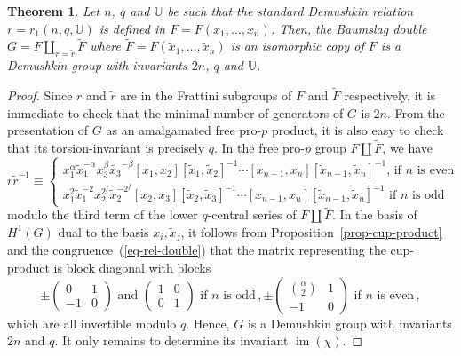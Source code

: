 \documentclass[a4paper]{amsart}
\newtheorem{thm}{Theorem}[section]
\theoremstyle{definition}
\begin{document}
\begin{thm}\label{thm-double} Let \(n\), \(q\) and \(\mathbb{U}\) be such that the standard Demushkin relation \(r = r_1(n,q,\mathbb{U})\) is defined in \(F = F(x_1,\ldots,x_n)\). Then, the Baumslag double \(G = F \amalg_{r = \widetilde{r}} \widetilde{F}\) where \(\widetilde{F} = F(\widetilde{x}_1,\ldots,\widetilde{x}_n)\) is an isomorphic copy of \(F\) is a Demushkin group with invariants \(2n\), \(q\) and \(\mathbb{U}\).
\end{thm}
\begin{proof} Since \(r\) and \(\widetilde{r}\) are in the Frattini subgroups of \(F\) and \(\widetilde{F}\) respectively, it is immediate to check that the minimal number of generators of \(G\) is \(2n\). From the presentation of \(G\) as an amalgamated free pro-\(p\) product, it is also easy to check that its torsion-invariant is precisely \(q\). In the free pro-\(p\) group \(F \amalg \widetilde{F}\), we have \begin{equation}\label{eq-rel-double}r\widetilde{r}^{-1} \equiv \begin{cases}x_1^\alpha\widetilde{x}_1^{-\alpha}x_3^\beta\widetilde{x_3}^{-\beta} [x_1,x_2][\widetilde{x}_1,\widetilde{x}_2]^{-1} \cdots [x_{n-1},x_n][\widetilde{x}_{n-1},\widetilde{x}_n]^{-1}\text{, if }n\text{ is even}\\ x_1^2\widetilde{x}_1^{-2}x_2^{2^f}\widetilde{x}_2^{-2^f}[x_2,x_3][\widetilde{x}_2,\widetilde{x}_3]^{-1}\cdots [x_{n-1},x_n][\widetilde{x}_{n-1},\widetilde{x}_n]^{-1}\text{ if }n\text{ is odd}\end{cases}\end{equation} modulo the third term of the lower \(q\)-central series of \(F \amalg \widetilde{F}\). In the basis of \(H^1(G)\) dual to the basis \(x_i,\widetilde{x}_j\), it follows from Proposition~\ref{prop-cup-product} and the congruence~(\ref{eq-rel-double}) that the matrix representing the cup-product is block diagonal with blocks \[ \pm\begin{pmatrix}0 & 1 \\ -1 & 0\end{pmatrix}\text{ and }\begin{pmatrix}1 & 0 \\ 0 & 1\end{pmatrix} \text{ if }n\text{ is odd}\,, \pm\begin{pmatrix}
    \binom{\alpha}{2} & 1\\ -1 & 0
\end{pmatrix} \text{ if }n\text{ is even}\,,\] which are all invertible modulo \(q\). Hence, \(G\) is a Demushkin group with invariants \(2n\) and \(q\). It only remains to determine its invariant \(\operatorname{im}(\chi)\).


\end{proof}
\end{document}
